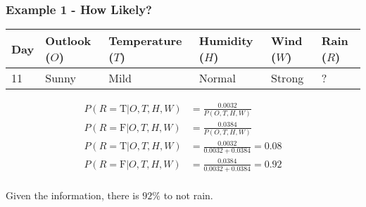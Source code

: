 \documentclass[aspectratio=169, 10pt]{beamer}
\begin{document}
\begin{frame}[t]
    \frametitle{Example 1 - How Likely?}
    \begin{table}[]
        \small
        \begin{tabular}{l|llll|l}
        \textbf{Day} & \textbf{Outlook} ($O$) & \textbf{Temperature} ($T$) & \textbf{Humidity} ($H$) & \textbf{Wind} ($W$) & \textbf{Rain} ($R$) \\ \hline
        11           & Sunny            & Mild                 & Normal            & Strong        & ?            
        \end{tabular}
    \end{table}

    \begin{align*}
        P(R=\text{T}|O,T,H,W) & = \frac{0.0032}{P(O,T,H,W)}\\
        P(R=\text{F}|O,T,H,W) & = \frac{0.0384}{P(O,T,H,W)}\\
        P(R=\text{T}|O,T,H,W) & = \frac{0.0032}{0.0032 + 0.0384} = 0.08\\
        P(R=\text{F}|O,T,H,W) & = \frac{0.0384}{0.0032 + 0.0384} = 0.92\\
    \end{align*}

    Given the information, there is $92\%$ to not rain.
\end{frame}
\end{document}

